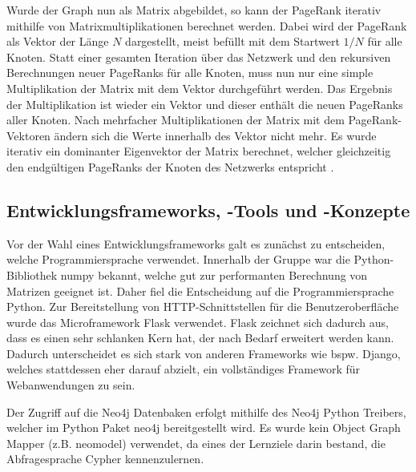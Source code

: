 Wurde der Graph nun als Matrix abgebildet, so kann der PageRank iterativ mithilfe von Matrixmultiplikationen berechnet werden. Dabei wird der PageRank als Vektor der Länge $N$ dargestellt, meist befüllt mit dem Startwert $1/N$ für alle Knoten. Statt einer gesamten Iteration über das Netzwerk und den rekursiven Berechnungen neuer PageRanks für alle Knoten, muss nun nur eine simple Multiplikation der Matrix mit dem Vektor durchgeführt werden. Das Ergebnis der Multiplikation ist wieder ein Vektor und dieser enthält die neuen PageRanks aller Knoten. Nach mehrfacher Multiplikationen der Matrix mit dem PageRank-Vektoren ändern sich die Werte innerhalb des Vektor nicht mehr. Es wurde iterativ ein dominanter Eigenvektor der Matrix berechnet, welcher gleichzeitig den endgültigen PageRanks der Knoten des Netzwerks entspricht \cite{pagerank_eigenvector}. 

\subsection{Entwicklungsframeworks, -Tools und -Konzepte}

Vor der Wahl eines Entwicklungsframeworks galt es zunächst zu entscheiden, welche Programmiersprache verwendet. Innerhalb der Gruppe war die Python-Bibliothek numpy bekannt, welche gut zur performanten Berechnung von Matrizen geeignet ist.
Daher fiel die Entscheidung auf die Programmiersprache Python. Zur Bereitstellung von HTTP-Schnittstellen für die Benutzeroberfläche wurde das Microframework Flask verwendet.
Flask zeichnet sich dadurch aus, dass es einen sehr schlanken Kern hat, der nach Bedarf erweitert werden kann. Dadurch unterscheidet es sich stark von anderen Frameworks wie bspw. Django, welches stattdessen eher darauf abzielt, ein vollständiges Framework für Webanwendungen zu sein.

Der Zugriff auf die Neo4j Datenbaken erfolgt mithilfe des Neo4j Python Treibers, welcher im Python Paket neo4j bereitgestellt wird. Es wurde kein Object Graph Mapper (z.B. neomodel) verwendet, da eines der Lernziele darin bestand, die Abfragesprache Cypher kennenzulernen.


